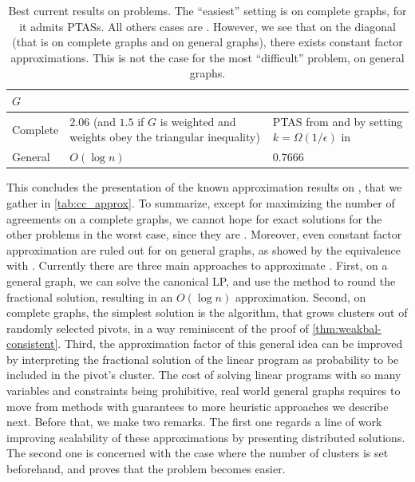 \begin{table}
  \caption[Best current results on \pcc{} problems]{Best current results on \pcc{} problems. The \enquote{easiest} setting is \maxa{} on
      complete graphs, for it admits PTASs. All others cases are \APXh{}. However, we see that on
      the diagonal (that is \mind{} on complete graphs and \maxa{} on general graphs), there exists
      constant factor approximations. This is not the case for the most \enquote{difficult} problem,
      \mind{} on general graphs. \label{tab:cc_approx}}
   \begin{tabulary}{\textwidth}{lLL}
      \toprule
      $G$      &  \mind{}                                                  & \maxa{}                                 \\
      \midrule
      Complete &  $2.06$ (and $1.5$ if $G$ is weighted and weights obey the triangular inequality) \autocite{Chawla2014}
               & PTAS from \textcite{Bansal2002} and by setting $k=\Omega(1/\epsilon)$ in \autocite{Giotis2006}      \\
      General  &  $O(\log n)$ \autocite{Charikar2003}                      & $0.7666$ \autocite{Swamy2004}           \\
      \bottomrule
   \end{tabulary}
\end{table}

\medskip

This concludes the presentation of the known approximation results on \pcc{}, that we gather in
\autoref{tab:cc_approx}.
To summarize, except for maximizing the number of agreements on a complete graphs, we cannot hope
for exact solutions for the other problems in the worst case, since they are \APXh{}. Moreover, even
constant factor approximation are ruled out for \mind{} on general graphs, as showed by the
equivalence with \mmc{}.
Currently there are three main approaches to approximate \mind{}. First, on a general graph,
we can solve the canonical LP, and use the \regionGrow{} method to round the fractional solution,
resulting in an $O(\log n)$ approximation. Second, on complete graphs, the simplest solution is the
\ccpivot{} algorithm, that grows clusters out of randomly selected pivots, in a way reminiscent of
the proof of \autoref{thm:weakbal-consistent}. Third, the approximation factor of this general idea can be
improved by interpreting the fractional solution of the linear program as probability to be included
in the pivot's cluster. The cost of solving linear programs with so many variables and constraints
being prohibitive, real world general graphs requires to move from methods with guarantees to more
heuristic approaches we describe next. Before that, we make two remarks. The first one regards a
line of work improving scalability of these approximations by presenting distributed solutions. The
second one is concerned with the case where the number of clusters is set beforehand, and proves
that the problem becomes easier.

